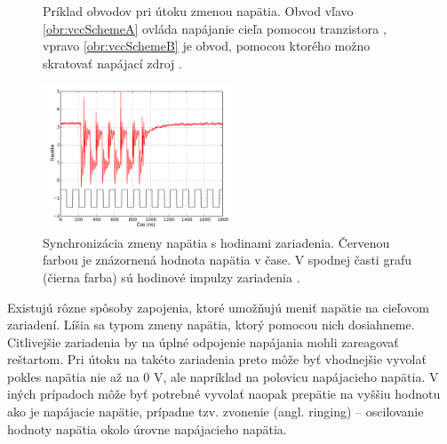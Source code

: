\begin{figure}[!tbp]
  \centering
  \hfill
  \caption[Príklad obvodov pri útoku zmenou napätia]{Príklad obvodov pri útoku zmenou napätia. Obvod vľavo \ref{obr:vccSchemeA} ovláda napájanie cieľa pomocou tranzistora \cite{vccOnTheCheap}, vpravo \ref{obr:vccSchemeB} je obvod, pomocou ktorého možno skratovať napájací zdroj \cite{crowbars}.}
  \label{obr:vccScheme}
\end{figure}

\begin{figure}
    \centerline{\includegraphics[width=0.5\textwidth]{images/vccSync.png}}
    \caption[Synchronizácia zmeny napätia s hodinami zariadenia]{Synchronizácia zmeny napätia s hodinami zariadenia. Červenou farbou je znázornená hodnota napätia v čase. V spodnej časti grafu (čierna farba) sú hodinové impulzy zariadenia \cite{crowbars}.}
    \label{obr:vccSync}
\end{figure}

Existujú rôzne spôsoby zapojenia, ktoré umožňujú meniť napätie na cieľovom zariadení. Líšia sa typom zmeny napätia, ktorý pomocou nich dosiahneme. Citlivejšie zariadenia by na úplné odpojenie napájania mohli zareagovať reštartom. Pri útoku na takéto zariadenia preto môže byť vhodnejšie vyvolať pokles napätia nie až na 0 V, ale napríklad na polovicu napájacieho napätia. V iných prípadoch môže byť potrebné vyvolať naopak prepätie na vyššiu hodnotu ako je napájacie napätie, prípadne tzv. zvonenie (angl. ringing) -- oscilovanie hodnoty napätia okolo úrovne napájacieho napätia.

